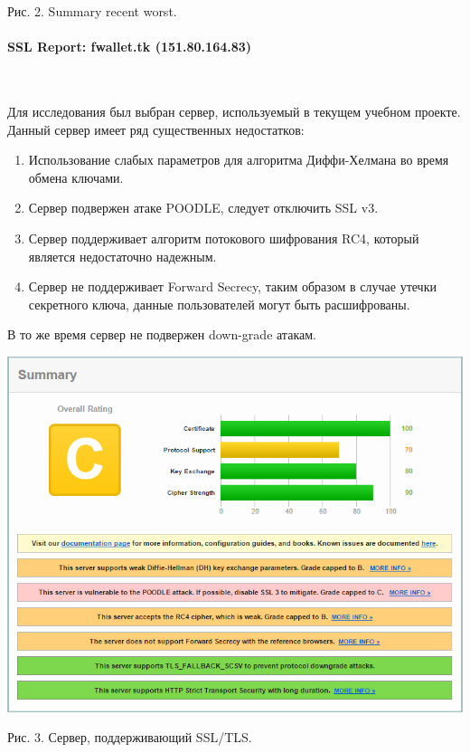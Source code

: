\documentclass{article}
\begin{document}
\begin{center}
Рис. 2. Summary recent worst.
\end{center}

\paragraph{SSL Report: fwallet.tk (151.80.164.83)}
~

Для исследования был выбран сервер, используемый в текущем учебном проекте.
Данный сервер имеет ряд существенных недостатков:
\begin{enumerate}
\item Использование слабых параметров для алгоритма Диффи-Хелмана во время обмена ключами.
\item Сервер подвержен атаке POODLE, следует отключить SSL v3.
\item Сервер поддерживает алгоритм потокового шифрования RC4, который является недостаточно надежным.
\item Сервер не поддерживает Forward Secrecy, таким образом в случае утечки секретного ключа, данные пользователей могут быть расшифрованы.
\end{enumerate}

В то же время сервер не подвержен down-grade атакам.

\begin{center}
\includegraphics[scale=0.8]{custom}
\end{center}

\begin{center}
Рис. 3. Сервер, поддерживающий SSL/TLS.
\end{center}
\end{document}
